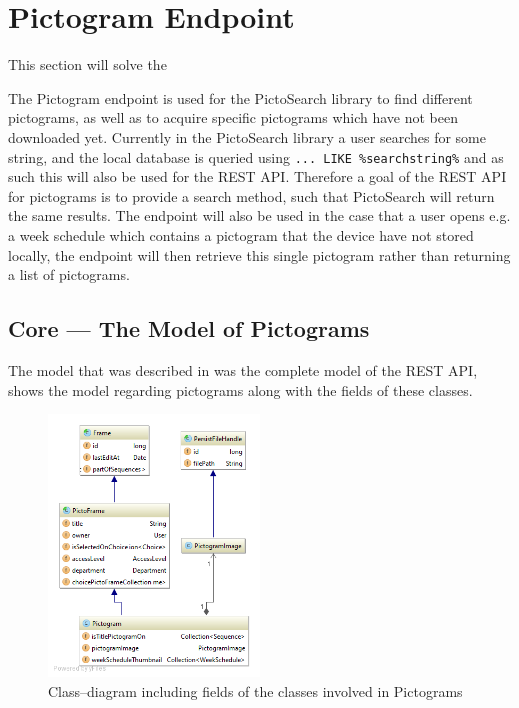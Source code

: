 \section{Pictogram Endpoint}\label{sec:pictogramendpoint}
This section will solve the 

The Pictogram endpoint is used for the PictoSearch library to find different pictograms, as well as to acquire specific pictograms which have not been downloaded yet.
Currently in the PictoSearch library a user searches for some string, and the local database is queried using \texttt{... LIKE \%searchstring\%} and as such this will also be used for the REST API.
Therefore a goal of the REST API for pictograms is to provide a search method, such that PictoSearch will return the same results.
The endpoint will also be used in the case that a user opens e.g. a week schedule which contains a pictogram that the device have not stored locally, the endpoint will then retrieve this single pictogram rather than returning a list of pictograms.

\subsection{Core --- The Model of Pictograms}\label{subsec:pictomodel}
The model that was described in  was the complete model of the REST API,  shows the model regarding pictograms along with the fields of these classes.

\begin{figure}[h]
    \centering
    \includegraphics[width=0.5\textwidth]{figures/diagram-pictogram.png}
    \caption{Class--diagram including fields of the classes involved in Pictograms}\label{fig:pictogramModel}
\end{figure}


